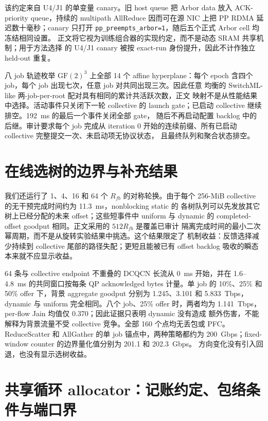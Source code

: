 该约定来自 U4/J1 的单变量 canary。旧 host queue 把 Arbor data 放入
ACK-priority queue，持续的 multipath AllReduce 因而可在源 NIC 上把 PP
RDMA 延迟数十毫秒；canary 只打开
\texttt{pp\_preempts\_arbor=1}，随后五个正式 Arbor cell 均冻结相同设置。
正文将它视为训练组合器的实现约定，而不是动态 SRAM 共享机制；用于方法选择
的 U4/J1 canary 被按 exact-run 身份提升，因此不计作独立 held-out 重复。

八 job 轨迹枚举 $\mathrm{GF}(2)^3$ 上全部 14 个 affine hyperplane：每个
epoch 含四个 job，每个 job 出现七次，任意 job 对共同出现三次。因此任意
均衡的 SwitchML-like 两-job-per-root 配对具有相同的累计共活跃次数，正文
映射不是从性能结果中选择。活动事件只关闭下一轮 collective 的 launch
gate；已启动 collective 继续排空。192~ms 的最后一个事件关闭全部 gate，
随后不再启动配置 backlog 中的后继。审计要求每个 job 完成从 iteration 0
开始的连续前缀、所有已启动 collective 完整提交一次、未启动项无协议状态，
且最终队列和聚合状态排空。

\chapter{在线选树的边界与补充结果}
\label{app:multipath-details}

我们还运行了 1、4、16 和 64 个 $R_{fb}$ 的对称轮换。由于每个
256-MiB collective 的无干预完成时间约为 11.3~ms，nonblocking static 的
各树队列可以先发放其它树上已经分配的未来 offset；这些短事件中 uniform 与
dynamic 的 completed-offset goodput 相同。正文采用的 $512R_{fb}$ 是覆盖已审计
隔离完成时间的最小二次幂周期，而不是从旋转实验结果中挑选。这个结果限定了
机制收益：反馈选择减少持续到 collective 尾部的路径失配；更短且能被已有
offset backlog 吸收的瞬态本来就不应显示收益。

64 条与 collective endpoint 不重叠的 DCQCN 长流从 0~ms 开始，并在
1.6--4.8~ms 的共同窗口按每条 QP acknowledged bytes 计量。单 job 的
10\%、25\% 和 50\% offer 下，背景 aggregate goodput 分别为 1.245、3.101 和
5.833~Tbps，dynamic 与 uniform 完全相同。八个 job、25\% offer 时，两者均为
1.141~Tbps，per-flow Jain 均值仅 0.370；因此证据只表明 dynamic 没有造成
额外伤害，不能解释为背景流量不受 collective 竞争。全部 160 个点均无丢包或
PFC。ReduceScatter 和 AllGather 的单 job 锚点中，两种策略都约为
200~Gbps；fixed-window counter 的边界量化值分别为 201.1 和 202.3~Gbps。
方向变化没有引入回退，也没有显示选树收益。

\chapter{共享循环 allocator：记账约定、包络条件与端口界}
\label{app:allocator-port-bound}

